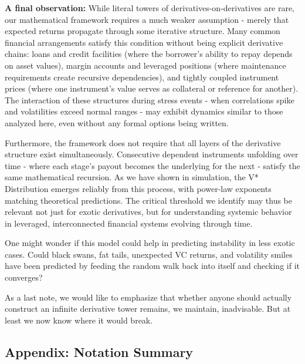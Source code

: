 \documentclass[
  11pt,
  openany]{article}
\begin{document}
\textbf{A final observation:} While literal towers of
derivatives-on-derivatives are rare, our mathematical framework requires
a much weaker assumption - merely that expected returns propagate
through some iterative structure. Many common financial arrangements
satisfy this condition without being explicit derivative chains: loans
and credit facilities (where the borrower's ability to repay depends on
asset values), margin accounts and leveraged positions (where
maintenance requirements create recursive dependencies), and tightly
coupled instrument prices (where one instrument's value serves as
collateral or reference for another). The interaction of these
structures during stress events - when correlations spike and
volatilities exceed normal ranges - may exhibit dynamics similar to
those analyzed here, even without any formal options being written.

Furthermore, the framework does not require that all layers of the
derivative structure exist simultaneously. Consecutive dependent
instruments unfolding over time - where each stage's payout becomes the
underlying for the next - satisfy the same mathematical recursion. As we
have shown in simulation, the V* Distribution emerges reliably from this
process, with power-law exponents matching theoretical predictions. The
critical threshold we identify may thus be relevant not just for exotic
derivatives, but for understanding systemic behavior in leveraged,
interconnected financial systems evolving through time.

One might wonder if this model could help in predicting instability in
less exotic cases. Could black swans, fat tails, unexpected VC returns,
and volatility smiles have been predicted by feeding the random walk
back into itself and checking if it converges?

As a last note, we would like to emphasize that whether anyone should
actually construct an infinite derivative tower remains, we maintain,
inadvisable. But at least we now know where it would break.

\subsection{Appendix: Notation Summary}\label{appendix-notation-summary}
\end{document}
